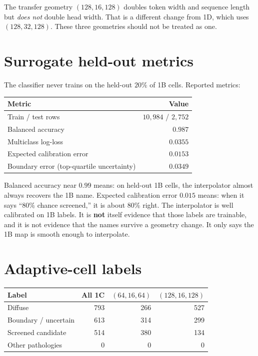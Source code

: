 \documentclass[11pt,a4paper]{report}
\begin{document}
The transfer geometry $(128,16,128)$ doubles token width and sequence length but \emph{does not} double head width. That is a different change from 1D, which uses $(128,32,128)$. These three geometries should not be treated as one.

\section{Surrogate held-out metrics}

The classifier never trains on the held-out $20\%$ of 1B cells. Reported metrics:

\begin{center}
\begin{tabular}{lr}
\toprule
Metric & Value \\
\midrule
Train / test rows & $10{,}984$ / $2{,}752$ \\
Balanced accuracy & $0.987$ \\
Multiclass log-loss & $0.0355$ \\
Expected calibration error & $0.0153$ \\
Boundary error (top-quartile uncertainty) & $0.0349$ \\
\bottomrule
\end{tabular}
\end{center}

Balanced accuracy near $0.99$ means: on held-out 1B cells, the interpolator almost always recovers the 1B name. Expected calibration error $0.015$ means: when it says ``80\% chance screened,'' it is about 80\% right. The interpolator is well calibrated on 1B labels. It is \textbf{not} itself evidence that those labels are trainable, and it is not evidence that the names survive a geometry change. It only says the 1B map is smooth enough to interpolate.

\section{Adaptive-cell labels}

\begin{center}
\begin{tabular}{lrrr}
\toprule
Label & All 1C & $(64,16,64)$ & $(128,16,128)$ \\
\midrule
Diffuse & 793 & 266 & 527 \\
Boundary / uncertain & 613 & 314 & 299 \\
Screened candidate & 514 & 380 & 134 \\
Other pathologies & 0 & 0 & 0 \\
\bottomrule
\end{tabular}
\end{center}
\end{document}
